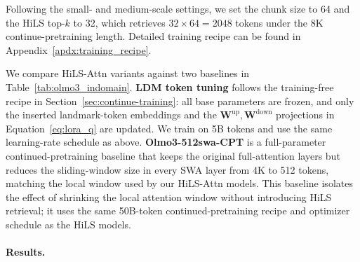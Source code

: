 Following the small- and medium-scale settings, we set the chunk size to 64 and the HiLS top-$k$ to 32, which retrieves $32 \times 64 = 2048$ tokens under the 8K continue-pretraining length. Detailed training recipe can be found in Appendix~\ref{apdx:training_recipe}.




We compare HiLS-Attn variants against two baselines in Table~\ref{tab:olmo3_indomain}.
\textbf{LDM token tuning} follows the training-free recipe in Section~\ref{sec:continue-training}: all base parameters are frozen, and only the inserted landmark-token embeddings and the $\mathbf{W}^{\mathrm{up}}, \mathbf{W}^{\mathrm{down}}$ projections in Equation~\ref{eq:lora_q} are updated.
We train on 5B tokens and use the same learning-rate schedule as above.
\textbf{Olmo3-512swa-CPT} is a full-parameter continued-pretraining baseline that keeps the original full-attention layers but reduces the sliding-window size in every SWA layer from 4K to 512 tokens, matching the local window used by our HiLS-Attn models.
This baseline isolates the effect of shrinking the local attention window without introducing HiLS retrieval; it uses the same 50B-token continued-pretraining recipe and optimizer schedule as the HiLS models.
\paragraph{Results.} %

